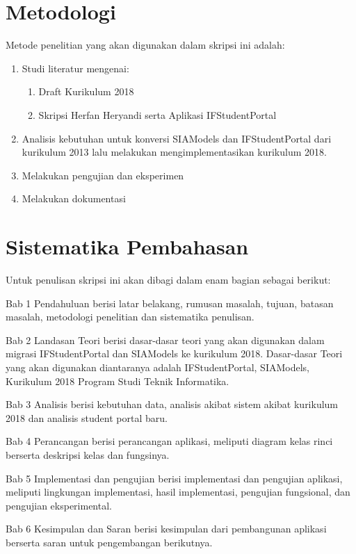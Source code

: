 \section{Metodologi}
\label{sec:metlit}
Metode penelitian yang akan digunakan dalam skripsi ini adalah:
\begin{enumerate}
	\item Studi literatur mengenai:
	\begin{enumerate}
		\item Draft Kurikulum 2018
		\item Skripsi Herfan Heryandi serta Aplikasi IFStudentPortal
	\end{enumerate}
	\item Analisis kebutuhan untuk konversi SIAModels dan IFStudentPortal dari kurikulum 2013 lalu melakukan mengimplementasikan kurikulum 2018.
	\item Melakukan pengujian dan eksperimen
	\item Melakukan dokumentasi
	
\end{enumerate}

\section{Sistematika Pembahasan}
\label{sec:sispem}
Untuk penulisan skripsi ini akan dibagi dalam enam bagian sebagai berikut:

Bab 1 Pendahuluan berisi latar belakang, rumusan masalah, tujuan, batasan masalah, metodologi penelitian dan sistematika penulisan.

Bab 2 Landasan Teori berisi dasar-dasar teori yang akan digunakan dalam migrasi IFStudentPortal dan SIAModels ke kurikulum 2018. Dasar-dasar Teori yang akan digunakan diantaranya adalah IFStudentPortal, SIAModels, Kurikulum 2018 Program Studi Teknik Informatika. 

Bab 3 Analisis berisi kebutuhan data, analisis akibat sistem akibat kurikulum 2018 dan analisis student portal baru.

Bab 4 Perancangan berisi perancangan aplikasi, meliputi diagram kelas rinci berserta deskripsi kelas dan fungsinya.

Bab 5 Implementasi dan pengujian berisi implementasi dan pengujian aplikasi, meliputi lingkungan implementasi, hasil implementasi, pengujian fungsional, dan pengujian eksperimental.

Bab 6 Kesimpulan dan Saran berisi kesimpulan dari pembangunan aplikasi berserta saran untuk pengembangan berikutnya.